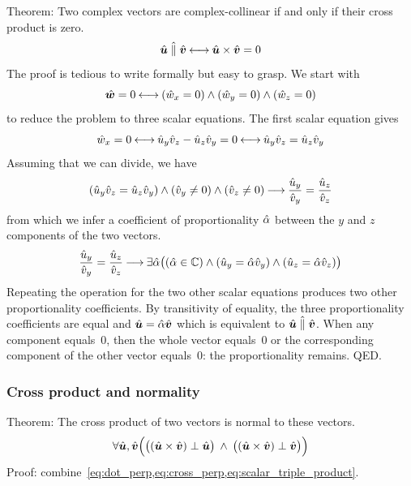 Theorem: Two complex vectors are complex-collinear if and only if their cross product is zero.
\begin{equation}
    \hat{\bm{u}} \;\hat{\parallel}\; \hat{\bm{v}}  \mathbin{\longleftrightarrow}   \hat{\bm{u}} \times \hat{\bm{v}} = 0
\end{equation}
The proof is tedious to write formally but easy to grasp.
We start with
\begin{equation*}
    \hat{\bm{w}} = 0
    \mathbin{\longleftrightarrow}
    (\hat{w}_x = 0)   \land   (\hat{w}_y = 0)   \land   (\hat{w}_z = 0)
\end{equation*}
to reduce the problem to three scalar equations.
The first scalar equation gives
\begin{equation*}
    \hat{w}_x = 0
    \mathbin{\longleftrightarrow}
    \hat{u}_y \hat{v}_z - \hat{u}_z \hat{v}_y = 0
    \mathbin{\longleftrightarrow}
    \hat{u}_y \hat{v}_z = \hat{u}_z \hat{v}_y
\end{equation*}
Assuming that we can divide, we have
\begin{equation*}
    (\hat{u}_y \hat{v}_z = \hat{u}_z \hat{v}_y)
    \land (\hat{v}_y \ne 0)
    \land (\hat{v}_z \ne 0)
    \mathbin{\longrightarrow}
    \frac{\hat{u}_y}{\hat{v}_y} = \frac{\hat{u}_z}{\hat{v}_z}
\end{equation*}
from which we infer a coefficient of proportionality $\hat{\alpha}$ between the $y$ and $z$ components of the two vectors.
\begin{equation*}
    \frac{\hat{u}_y}{\hat{v}_y} = \frac{\hat{u}_z}{\hat{v}_z}
    \mathbin{\longrightarrow}
    \exists \hat{\alpha} \big(
        (\hat{\alpha} \in \mathbb{C})
        \land
        (\hat{u}_y = \hat{\alpha} \hat{v}_y)
        \land
        (\hat{u}_z = \hat{\alpha} \hat{v}_z)
    \big)
\end{equation*}
Repeating the operation for the two other scalar equations produces two other proportionality coefficients.
By transitivity of equality, the three proportionality coefficients are equal and
$\hat{\bm{u}} = \hat{\alpha} \hat{\bm{v}}$ which is equivalent to $\hat{\bm{u}} \;\hat{\parallel}\; \hat{\bm{v}}$.
When any component equals~0, then the whole vector equals~0 or the corresponding component of the other vector equals~0: the proportionality remains.  QED.




\subsubsection{Cross product and normality}

Theorem:
The cross product of two vectors is normal to these vectors.
\begin{equation}
        \forall \hat{\bm{u}}, \hat{\bm{v}}
        \Big(
            \big( (\hat{\bm{u}} \times \hat{\bm{v}}) \perp \hat{\bm{u}} \big)
            \: \land \:
            \big( (\hat{\bm{u}} \times \hat{\bm{v}}) \perp \hat{\bm{v}} \big)
        \Big)
    \label{eq:cross_perp}
\end{equation}
Proof: combine~\cref{eq:dot_perp,eq:cross_perp,eq:scalar_triple_product}.


